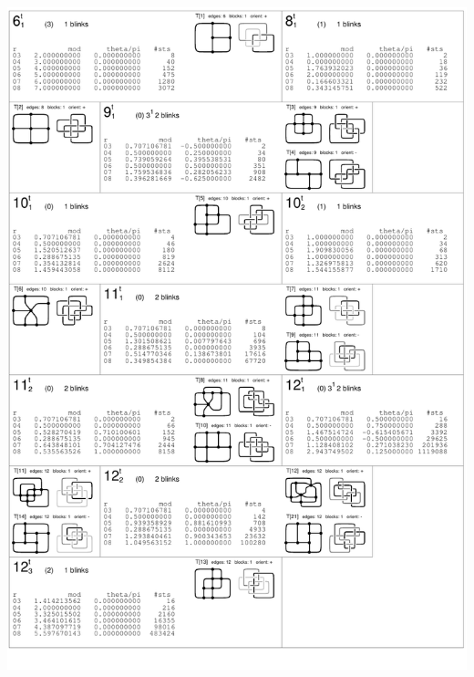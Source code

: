 \begin{center}
 \includegraphics[height=23.5cm]{E.figsbw2/con3catalog001_bw.pdf} \eject

\end{center}
